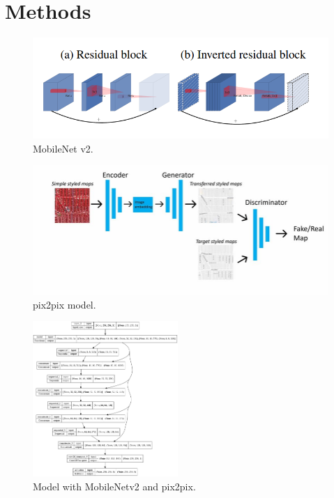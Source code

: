 \section{Methods}

\begin{frame}{\insertsectionhead}
  \begin{figure}[H]
    \includegraphics[width=15cm]{Graphics/mobilenetv2.png}
    \caption{MobileNet v2.}
  \end{figure}
\end{frame}

\begin{frame}{\insertsectionhead}
  \begin{figure}[H]
    \includegraphics[width=12cm]{Graphics/pix2pix.jpg}
    \caption{pix2pix model.}
  \end{figure}
\end{frame}

\begin{frame}{\insertsectionhead}
  \begin{figure}[H]
    \includegraphics[width=5.5cm]{Graphics/model.png}
    \caption{Model with MobileNetv2 and pix2pix.}
  \end{figure}
\end{frame}


